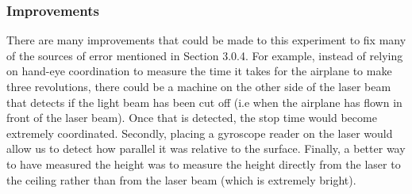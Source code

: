 \documentclass[10pt, letterpaper]{article}
\begin{document}
\subsubsection{Improvements}
There are many improvements that could be made to this experiment to fix many of the sources of error mentioned in Section 3.0.4. For example, instead of
relying on hand-eye coordination to measure the time it takes for the airplane to make three revolutions, there could be a machine on the other side of the
laser beam that detects if the light beam has been cut off (i.e when the airplane has flown in front of the laser beam). Once that is detected, the stop time
would become extremely coordinated. Secondly, placing a gyroscope reader on the laser would allow us to detect how parallel it was relative to the surface.
Finally, a better way to have measured the height was to measure the height directly from the laser to the ceiling rather than from the laser beam (which is
extremely bright).
\end{document}
